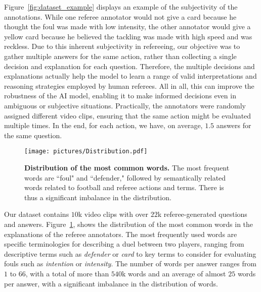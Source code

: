 Figure~\ref{fig:dataset_example} displays an example of the subjectivity of the annotations. While one referee annotator would not give a card because he thought the foul was made with low intensity, the other annotator would give a yellow card because he believed the tackling was made with high speed and was reckless.
Due to this inherent subjectivity in refereeing, our objective was to gather multiple answers for the same action, rather than collecting a single decision and explanation for each question.
Therefore, the multiple decisions and explanations actually help the model to learn a range of valid interpretations and reasoning strategies employed by human referees. All in all, this can improve the robustness of the AI model, enabling it to make informed decisions even in ambiguous or subjective situations.
Practically, the annotators were randomly assigned different video clips, ensuring that the same action might be evaluated multiple times. In the end, for each action, we have, on average, $1.5$ answers for the same question.

\begin{figure}
  \centering
  \texttt{[image: pictures/Distribution.pdf]}
\caption{
\textbf{Distribution of the most common words.} 
The most frequent words are ``foul" and ``defender," followed by semantically related words related to football and referee actions and terms. There is thus a significant imbalance in the distribution.
}
\label{fig:distribution}
\end{figure}
Our dataset contains $10$k video clips with over $22$k referee-generated questions and answers.
Figure~\ref{fig:distribution}, shows the distribution of the most common words in the explanations of the referee annotators. 
The most frequently used words are specific terminologies for describing a duel between two players, ranging from descriptive terms such as \textit{defender} or \textit{card} to key terms to consider for evaluating fouls such as \textit{intention} or \textit{intensity}.
The number of words per answer ranges from $1$ to $66$, with a total of more than $540$k words and an average of almost $25$ words per answer, with a significant imbalance in the distribution of words.

